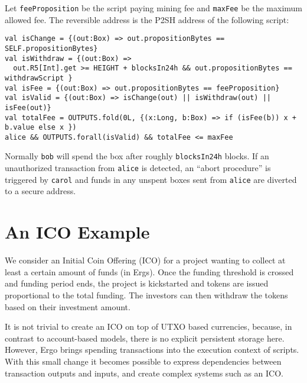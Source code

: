 \documentclass[runningheads]{llncs}
\begin{document}
Let \texttt{feeProposition} be the script paying mining fee and \texttt{maxFee} be the maximum allowed fee. The reversible address is the P2SH address of the following script:
\small{
\begin{verbatim}
val isChange = {(out:Box) => out.propositionBytes == SELF.propositionBytes}
val isWithdraw = {(out:Box) => 
  out.R5[Int].get >= HEIGHT + blocksIn24h && out.propositionBytes == withdrawScript }
val isFee = {(out:Box) => out.propositionBytes == feeProposition}
val isValid = {(out:Box) => isChange(out) || isWithdraw(out) || isFee(out)}
val totalFee = OUTPUTS.fold(0L, {(x:Long, b:Box) => if (isFee(b)) x + b.value else x })
alice && OUTPUTS.forall(isValid) && totalFee <= maxFee
\end{verbatim}
}
Normally \texttt{bob} will spend the box after roughly \texttt{blocksIn24h} blocks. If an unauthorized transaction from \texttt{alice} is detected, an ``abort procedure'' is triggered by \texttt{carol} and funds in any unspent boxes sent from \texttt{alice} are diverted to a secure address. %


\section{An ICO Example}
\label{ico}

We consider an Initial Coin Offering (ICO) for a project wanting to collect at least a certain amount of funds (in Ergs). Once the funding threshold is crossed and funding period ends, the project is kickstarted and tokens are issued proportional to the total funding. The investors can then withdraw the tokens based on their investment amount. %

It is not trivial to create an ICO on top of UTXO based currencies, because, in contrast to account-based models, there is no explicit persistent storage here. However, Ergo brings spending transactions into the execution context of scripts. With this small change it becomes possible to express dependencies between transaction outputs and inputs, and create complex systems such as an ICO.%
\end{document}

